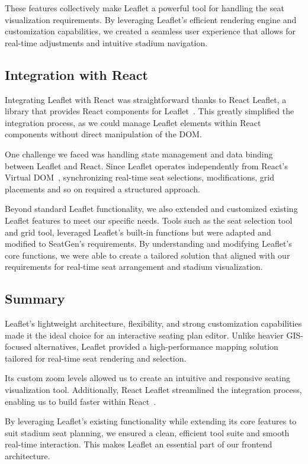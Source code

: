 These features collectively make Leaflet a powerful tool for handling the seat visualization requirements. By leveraging Leaflet’s efficient rendering engine and customization capabilities, we created a seamless user experience that allows for real-time adjustments and intuitive stadium navigation.

\subsection{Integration with React}
Integrating Leaflet with React was straightforward thanks to React Leaflet, a library that provides React components for Leaflet~\cite{ReactLeafletDocs}. This greatly simplified the integration process, as we could manage Leaflet elements within React components without direct manipulation of the DOM.

One challenge we faced was handling state management and data binding between Leaflet and React. Since Leaflet operates independently from React’s Virtual DOM~\cite{ReactLeafletDocs}, synchronizing real-time seat selections, modifications, grid placements and so on required a structured approach.

Beyond standard Leaflet functionality, we also extended and customized existing Leaflet features to meet our specific needs. Tools such as the seat selection tool and grid tool, leveraged Leaflet’s built-in functions but were adapted and modified to SeatGen’s requirements. By understanding and modifying Leaflet’s core functions, we were able to create a tailored solution that aligned with our requirements for real-time seat arrangement and stadium visualization.

\subsection{Summary}

Leaflet’s lightweight architecture, flexibility, and strong customization capabilities made it the ideal choice for an interactive seating plan editor. Unlike heavier GIS-focused alternatives, Leaflet provided a high-performance mapping solution tailored for real-time seat rendering and selection. 

Its custom zoom levels allowed us to create an intuitive and responsive seating visualization tool. Additionally, React Leaflet streamlined the integration process, enabling us to build faster within React~\cite{ReactLeafletDocs}.

By leveraging Leaflet’s existing functionality while extending its core features to suit stadium seat planning, we ensured a clean, efficient tool suite and smooth real-time interaction. This makes Leaflet an essential part of our frontend architecture.